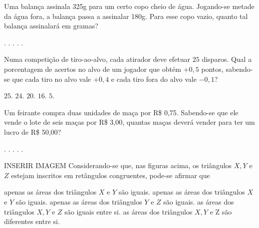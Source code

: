 \begin{question}%
Uma balança assinala 325g para um certo copo cheio de água. Jogando-se metade da água fora, a balança passa a assinalar 180g. Para esse copo vazio, quanto tal balança assinalará em gramas?
    \begin{tasks}
        .
        .
        .
        .
        .
    \end{tasks}
\end{question}

\begin{question}%
Numa competição de tiro-ao-alvo, cada atirador deve efetuar \(25\) disparos. Qual a porcentagem de acertos no alvo de um jogador que obtém \(+0,5\) pontos, sabendo-se que cada tiro no alvo vale \(+0,4\) e cada tiro fora do alvo vale \(-0,1\)?
    \begin{tasks}
        \task \(25\).
        \task \(24\).
        \task \(20\).
        \task \(16\).
        \task \(5\).
    \end{tasks}
\end{question}

\begin{question}%
Um feirante compra duas unidades de maça por R\$ 0,75. Sabendo-se que ele vende o lote de seis maças por R\$ 3,00, quantas maças deverá vender para ter um lucro de R\$ 50,00?
    \begin{tasks}
        .
        .
        .
        .
        .
    \end{tasks}
\end{question}

\begin{question}%
INSERIR IMAGEM
Considerando-se que, nas figuras acima, os triângulos \(X,Y\) e \(Z\) estejam inscritos em retângulos congruentes, pode-se afirmar que
    \begin{tasks}
        \task apenas as áreas dos triângulos \(X\) e \(Y\) são iguais.
        \task apenas as áreas dos triângulos \(X\) e \(Y\) são iguais.
        \task apenas as áreas dos triângulos \(Y\) e \(Z\) são iguais.
        \task as áreas dos triângulos \(X,Y\) e \(Z\) são iguais entre si.
        \task as áreas dos triângulos \(X, Y\) e Z são diferentes entre si.
    \end{tasks}
\end{question}

